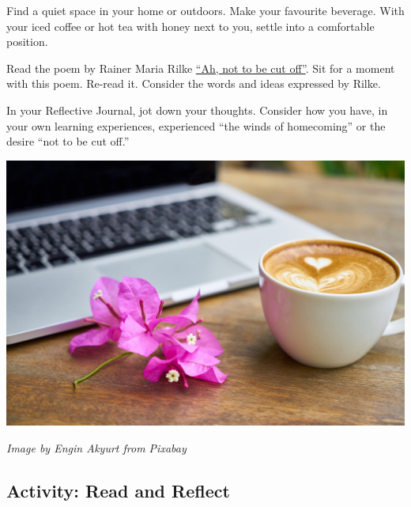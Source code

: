 \documentclass[
]{book}
\begin{document}
\begin{reflect}
Find a quiet space in your home or outdoors. Make your favourite
beverage. With your iced coffee or hot tea with honey next to you,
settle into a comfortable position.

Read the poem by Rainer Maria Rilke
\href{https://gladdestthing.com/poems/ah-not-to-be-cut-off}{``Ah, not to
be cut off''}. Sit for a moment with this poem. Re-read it. Consider the
words and ideas expressed by Rilke.

In your Reflective Journal, jot down your thoughts. Consider how you
have, in your own learning experiences, experienced ``the winds of
homecoming'' or the desire ``not to be cut off.''

\includegraphics{assets/unit3/coffee-2242212_1920.jpg}

\emph{Image by Engin Akyurt from Pixabay}
\end{reflect}

\hypertarget{activity-read-and-reflect}{%
\subsection*{Activity: Read and Reflect}\label{activity-read-and-reflect}}
\end{document}
